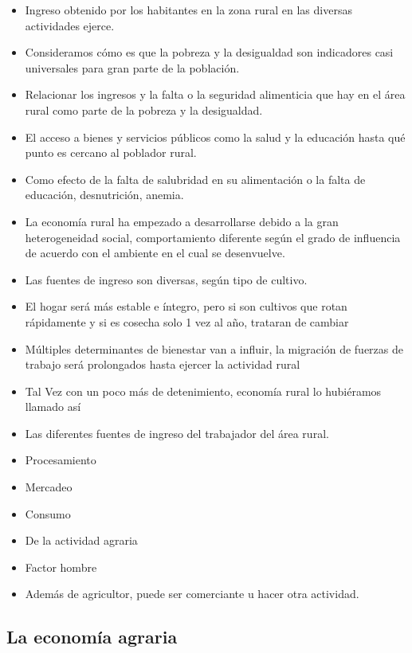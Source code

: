 \documentclass[
  letterpaper,
  DIV=11,
  numbers=noendperiod]{scrartcl}
\begin{document}
\begin{itemize}
\item
  Ingreso obtenido por los habitantes en la zona rural en las diversas
  actividades ejerce.
\item
  Consideramos cómo es que la pobreza y la desigualdad son indicadores
  casi universales para gran parte de la población.
\item
  Relacionar los ingresos y la falta o la seguridad alimenticia que hay
  en el área rural como parte de la pobreza y la desigualdad.
\item
  El acceso a bienes y servicios públicos como la salud y la educación
  hasta qué punto es cercano al poblador rural.
\item
  Como efecto de la falta de salubridad en su alimentación o la falta de
  educación, desnutrición, anemia.
\item
  La economía rural ha empezado a desarrollarse debido a la gran
  heterogeneidad social, comportamiento diferente según el grado de
  influencia de acuerdo con el ambiente en el cual se desenvuelve.
\item
  Las fuentes de ingreso son diversas, según tipo de cultivo.
\item
  El hogar será más estable e íntegro, pero si son cultivos que rotan
  rápidamente y si es cosecha solo 1 vez al año, trataran de cambiar
\item
  Múltiples determinantes de bienestar van a influir, la migración de
  fuerzas de trabajo será prolongados hasta ejercer la actividad rural
\item
  Tal Vez con un poco más de detenimiento, economía rural lo hubiéramos
  llamado así
\item
  Las diferentes fuentes de ingreso del trabajador del área rural.
\item
  Procesamiento
\item
  Mercadeo
\item
  Consumo
\item
  De la actividad agraria
\item
  Factor hombre
\item
  Además de agricultor, puede ser comerciante u hacer otra actividad.
\end{itemize}

\hypertarget{la-economuxeda-agraria-1}{%
\subsection{La economía agraria}\label{la-economuxeda-agraria-1}}
\end{document}
